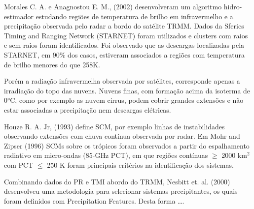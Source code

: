 Morales C. A. e Anagnostou E. M., (2002) desenvolveram um algoritmo hidro-estimador estudando regiões de temperatura de brilho em infravermelho e a precipitação observada pelo radar a bordo do satélite TRMM. Dados da Sferics Timing and Ranging Network (STARNET) foram utilizados e clusters com raios e sem raios foram identificados. Foi observado que as descargas localizadas pela STARNET, em 90\% dos casos, estiveram associados a regiões com temperatura de brilho menores do que 258K.

Porém a radiação infravermelha observada por satélites, corresponde apenas a irradiação do topo das nuvens. Nuvens finas, com formação acima da isoterma de 0°C, como por exemplo as nuvem cirrus, podem cobrir grandes extensões e não estar associadas a precipitação nem descargas elétricas.

Houze R. A. Jr, (1993) define SCM, por exemplo linhas de instabilidades observando extensões com chuva contínua observada por radar. Em Mohr and Zipser (1996) SCMs sobre os trópicos foram observados a partir do espalhamento radiativo em micro-ondas (85-GHz PCT), em que regiões contínuas $\geqslant$ 2000 km$^2$ com PCT $\leqslant$ 250 K foram principais critérios na identificação dos sistemas.

Combinando dados do PR e TMI abordo do TRMM, Nesbitt et. al. (2000) desenvolveu uma metodologia para selecionar sistemas precipitantes, os quais foram definidos com Precipitation Features. Desta forma …. 







